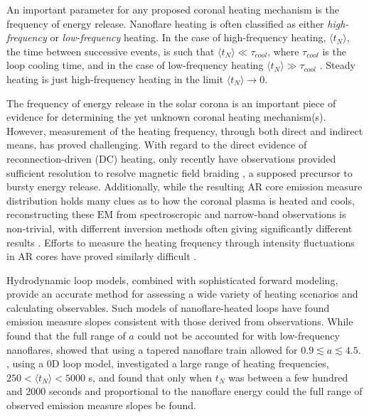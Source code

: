 \documentclass[apj]{emulateapj}
\begin{document}
	\par An important parameter for any proposed coronal heating mechanism is the frequency of energy release. Nanoflare heating is often classified as either \textit{high-frequency} or \textit{low-frequency} heating. In the case of high-frequency heating, $\langle t_N\rangle$, the time between successive events, is such that $\langle t_N\rangle\ll\tau_{cool}$, where $\tau_{cool}$ is the loop cooling time, and in the case of low-frequency heating $\langle t_N\rangle\gg\tau_{cool}$ \citep{cargill_modelling_2015}. Steady heating is just high-frequency heating in the limit $\langle t_N\rangle\to0$.
	\par The frequency of energy release in the solar corona is an important piece of evidence for determining the yet unknown coronal heating mechanism(s). However, measurement of the heating frequency, through both direct and indirect means, has proved challenging. With regard to the direct evidence of reconnection-driven (DC) heating, only recently have observations provided sufficient resolution to resolve magnetic field braiding \citep{cirtain_energy_2013}, a supposed precursor to bursty energy release. Additionally, while the resulting AR core emission measure distribution holds many clues as to how the coronal plasma is heated and cools, reconstructing these $\mathrm{EM}$ from spectroscropic and narrow-band observations is non-trivial, with differrent inversion methods often giving significantly different results \citep{landi_monte_2012,aschwanden_benchmark_2015}. Efforts to measure the heating frequency through intensity fluctuations in AR cores have proved similarly difficult \citep{ugarte-urra_determining_2014}.
	\par Hydrodynamic loop models, combined with sophisticated forward modeling, provide an accurate method for assessing a wide variety of heating scenarios and calculating observables. Such models of nanoflare-heated loops have found emission measure slopes consistent with those derived from observations. While \citet{bradshaw_diagnosing_2012} found that the full range of $a$ could not be accounted for with low-frequency nanoflares, \citet{reep_diagnosing_2013} showed that using a tapered nanoflare train allowed for $0.9\lesssim a\lesssim4.5$. \citet{cargill_active_2014}, using a 0D loop model, investigated a large range of heating frequencies, $250<\langle t_N\rangle<5000$ s, and found that only when $t_N$ was between a few hundred and 2000 seconds and proportional to the nanoflare energy could the full range of observed emission measure slopes be found. 
\end{document}
